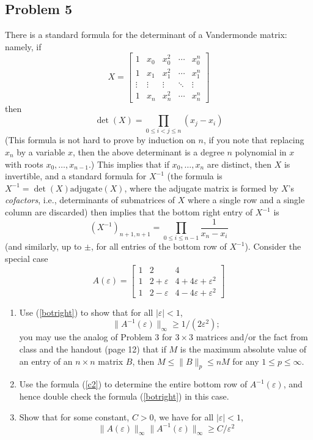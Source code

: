 \documentclass{article}
\newcommand{\ep}{{\varepsilon}}
\begin{document}
\subsection*{Problem 5}
There is a standard formula for the determinant of a Vandermonde matrix: namely, if
\[
	X =
	\begin{bmatrix}
		1 & x_0 & x_0^2 & \cdots & x_0^n\\
		1 & x_1 & x_1^2 & \cdots & x_1^n\\
		\vdots & \vdots & \vdots & \ddots & \vdots\\
		1 & x_n & x_n^2 & \cdots & x_n^n
	\end{bmatrix}
\]
then
\[
	\det(X) = \prod_{0 \leq i < j \leq n} (x_j - x_i)
\]
(This formula is not hard to prove by induction on $n$,
if you note that replacing $x_n$ by a variable $x$,
then the above determinant is a degree $n$ polynomial in $x$
with roots $x_0,\dots,x_{n-1}$.)
This implies that if $x_0,\dots,x_n$ are distinct, then $X$ is invertible,
and a standard formula for $X^{-1}$
(the formula is $X^{-1} = \det(X)\mathrm{adjugate}(X)$,
where the adjugate matrix is formed by $X$'s \emph{cofactors},
i.e., determinants of submatrices of $X$ where a single row
and a single column are discarded)
then implies that the bottom right entry of $X^{-1}$ is
\begin{equation}\label{botright}
	(X^{-1})_{n+1,n+1} = \prod_{0\leq i \leq n-1} \frac{1}{x_n - x_i}
\end{equation}
(and similarly, up to $\pm$, for all entries of the bottom row of $X^{-1}$).
Consider the special case
\[
	A(\ep) =
	\begin{bmatrix}
		1 & 2 & 4\\
		1 & 2+\ep & 4 + 4\ep + \ep^2\\
		1 & 2-\ep & 4 - 4\ep + \ep^2
	\end{bmatrix}
\]
\begin{enumerate}
	\item Use (\ref{botright}) to show that for all $|\ep| < 1$,
		\[
			\lVert A^{-1}(\ep) \rVert_\infty \geq 1/(2\ep^2);
		\]
		you may use the analog of Problem 3 for $3\times 3$ matrices
		and/or the fact from class and the handout (page 12) that if
		$M$ is the maximum absolute value of an entry of an $n \times n$ matrix $B$,
		then $M \leq \lVert B \rVert_p \leq nM$ for any $1 \leq p \leq \infty$.
	\item Use the formula (\ref{c2}) to determine the entire bottom row
		of $A^{-1}(\ep)$, and hence double check the formula (\ref{botright}) in this case.
	\item Show that for some constant, $C > 0$, we have for all $|\ep| < 1$,
		\[
			\lVert A(\ep) \rVert_\infty \lVert A^{-1}(\ep)\rVert_\infty
			\geq C/\ep^2
		\]
\end{enumerate}
\end{document}
